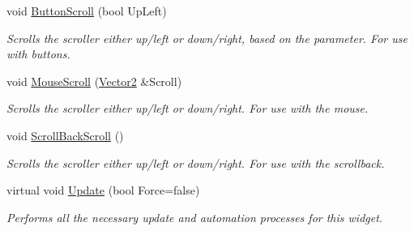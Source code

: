 \begin{DoxyCompactItemize}
void \hyperlink{classphys_1_1UI_1_1Scrollbar_a31a2e11f27f087154fd61d7cc2cd6dc1}{ButtonScroll} (bool UpLeft)
\begin{DoxyCompactList}\small\item\em Scrolls the scroller either up/left or down/right, based on the parameter. For use with buttons. \item\end{DoxyCompactList}\item 
void \hyperlink{classphys_1_1UI_1_1Scrollbar_ac50a2cd5b85c8b2ff0cabf22b898a0fa}{MouseScroll} (\hyperlink{classphys_1_1Vector2}{Vector2} \&Scroll)
\begin{DoxyCompactList}\small\item\em Scrolls the scroller either up/left or down/right. For use with the mouse. \item\end{DoxyCompactList}\item 
void \hyperlink{classphys_1_1UI_1_1Scrollbar_a1c6ca6b135d09d284b31fda2230c9286}{ScrollBackScroll} ()
\begin{DoxyCompactList}\small\item\em Scrolls the scroller either up/left or down/right. For use with the scrollback. \item\end{DoxyCompactList}\item 
virtual void \hyperlink{classphys_1_1UI_1_1Scrollbar_a628999b4caa32f3c273d45e64d5c62a0}{Update} (bool Force=false)
\begin{DoxyCompactList}\small\item\em Performs all the necessary update and automation processes for this widget. \item\end{DoxyCompactList}\end{DoxyCompactItemize}
